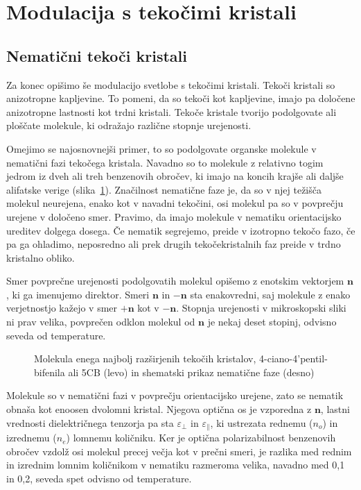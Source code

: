 \section{Modulacija s tekočimi kristali}

\subsection*{Nematični tekoči kristali}
Za konec opišimo še modulacijo svetlobe s tekočimi kristali. 
Tekoči kristali so anizotropne kapljevine. To pomeni, da so tekoči kot 
kapljevine, imajo pa določene anizotropne lastnosti kot trdni kristali. 
Tekoče kristale tvorijo podolgovate ali ploščate molekule, 
ki odražajo različne stopnje urejenosti. 

Omejimo se najosnovnejši
primer, to so podolgovate organske molekule v nematični fazi tekočega kristala. 
Navadno so to molekule z relativno togim jedrom iz
dveh ali treh benzenovih obročev, ki imajo na koncih krajše ali daljše
alifatske verige (slika~\ref{fig:5CB}). Značilnost nematične faze je, da
so v njej težišča molekul neurejena, enako kot v navadni tekočini, 
osi molekul pa so v povprečju urejene v določeno smer. Pravimo, da imajo molekule
v nematiku orientacijsko ureditev dolgega dosega. Če nematik segrejemo,
preide v izotropno tekočo fazo, če pa ga ohladimo, neposredno ali prek drugih
tekočekristalnih faz preide v trdno kristalno obliko. 

Smer povprečne urejenosti podolgovatih molekul opišemo z enotskim vektorjem 
$\mathbf{n}$, ki ga imenujemo direktor. Smeri $\mathbf{n}$ in $-\mathbf{n}$ sta 
enakovredni, saj molekule z enako verjetnostjo kažejo v smer $+\mathbf{n}$ kot 
v $-\mathbf{n}$. Stopnja urejenosti v mikroskopski sliki ni prav velika, povprečen
odklon molekul od $\mathbf{n}$ je nekaj deset stopinj, odvisno seveda od temperature.
\begin{figure}[h]
\centering
\def\svgwidth{30truemm} 
\qquad\qquad
\def\svgwidth{50truemm} 

\caption{Molekula enega najbolj razširjenih tekočih kristalov, 4-ciano-4'pentil-bifenila 
ali 5CB (levo) in shematski prikaz nematične faze (desno)}
\label{fig:5CB}
\end{figure}

Molekule so v nematični fazi v povprečju orientacijsko urejene, zato se nematik
obnaša kot enoosen dvolomni kristal. Njegova optična os je vzporedna 
z $\mathbf{n}$, lastni vrednosti dielektričnega tenzorja pa sta $\varepsilon_\bot$ in
$\varepsilon_{\parallel}$, ki ustrezata rednemu ($n_o$) in izrednemu ($n_e$) 
lomnemu količniku.  
Ker je optična polarizabilnost benzenovih obročev vzdolž osi molekul precej večja kot
v prečni smeri, je razlika med rednim in izrednim lomnim količnikom v nematiku razmeroma 
velika, navadno med 0,1 in 0,2, seveda spet odvisno od temperature.


